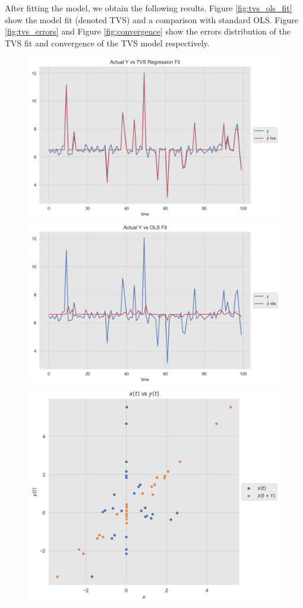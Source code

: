 \documentclass[11pt]{amsart}
\begin{document}
After fitting the model, we obtain the following results. Figure \ref{fig:tvs_ols_fit} show the model fit (denoted TVS) and a comparison with standard OLS. Figure \ref{fig:tvs_errors} and Figure \ref{fig:convergence} show the errors distribution of the TVS fit and  convergence of the TVS model respectively.

\begin{center}
\begin{figure}
\includegraphics[scale=0.6]{images/tvs_fit.png} 
\includegraphics[scale=0.3]{images/ols_fit.png} 
\includegraphics[scale=0.3]{images/scatterplot.png} 

\end{figure}
\end{center}
\end{document}
